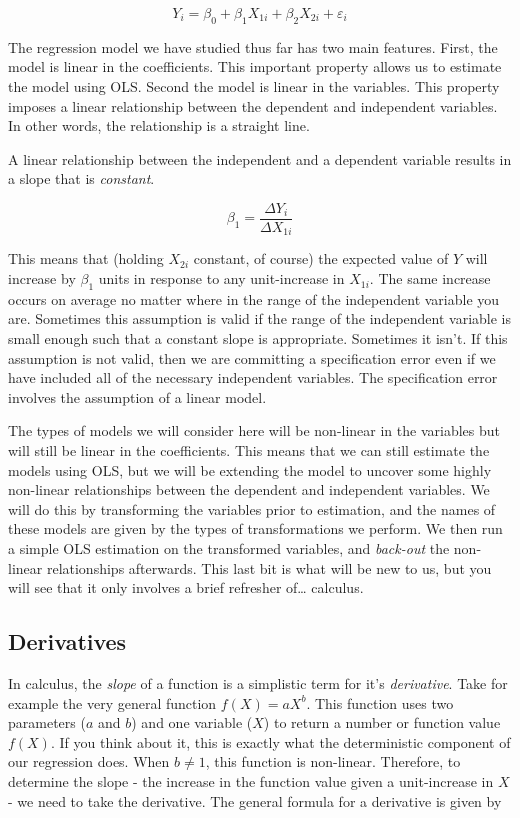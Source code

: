 \documentclass[
]{book}
\begin{document}
\[Y_i = \beta_0 + \beta_1 X_{1i} + \beta_2 X_{2i} + \varepsilon_i\]

The regression model we have studied thus far has two main features. First, the model is linear in the coefficients. This important property allows us to estimate the model using OLS. Second the model is linear in the variables. This property imposes a linear relationship between the dependent and independent variables. In other words, the relationship is a straight line.

A linear relationship between the independent and a dependent variable results in a slope that is \emph{constant}.

\[\beta_1 = \frac{\Delta Y_i}{\Delta X_{1i}}\]

This means that (holding \(X_{2i}\) constant, of course) the expected value of \(Y\) will increase by \(\beta_1\) units in response to any unit-increase in \(X_{1i}\). The same increase occurs on average no matter where in the range of the independent variable you are. Sometimes this assumption is valid if the range of the independent variable is small enough such that a constant slope is appropriate. Sometimes it isn't. If this assumption is not valid, then we are committing a specification error even if we have included all of the necessary independent variables. The specification error involves the assumption of a linear model.

The types of models we will consider here will be non-linear in the variables but will still be linear in the coefficients. This means that we can still estimate the models using OLS, but we will be extending the model to uncover some highly non-linear relationships between the dependent and independent variables. We will do this by transforming the variables prior to estimation, and the names of these models are given by the types of transformations we perform. We then run a simple OLS estimation on the transformed variables, and \emph{back-out} the non-linear relationships afterwards. This last bit is what will be new to us, but you will see that it only involves a brief refresher of\ldots{} calculus.

\hypertarget{derivatives}{%
\subsection{Derivatives}\label{derivatives}}

In calculus, the \emph{slope} of a function is a simplistic term for it's \emph{derivative}. Take for example the very general function \(f(X) = aX^b\). This function uses two parameters (\(a\) and \(b\)) and one variable (\(X\)) to return a number or function value \(f(X)\). If you think about it, this is exactly what the deterministic component of our regression does. When \(b\neq1\), this function is non-linear. Therefore, to determine the slope - the increase in the function value given a unit-increase in \(X\) - we need to take the derivative. The general formula for a derivative is given by
\end{document}
